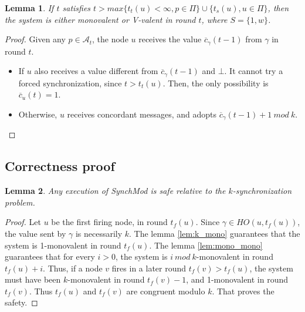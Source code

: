 \documentclass{article}
\newtheorem{lemma}{Lemma}[section]
\newcommand{\cent}{\gamma}
\newcommand{\ts}{t_{s}}
\newcommand{\tf}{t_{f}}
\newcommand{\try}{t_{t}}
\begin{document}
\begin{lemma}\label{lem:mono_bi}
	If $t$ satisfies $t > max \{\try(u) < \infty, p \in \Pi\} \cup \{\ts(u), u \in \Pi\}$,
	then the system is either monovalent or V-valent in round $t$, where $S = \{1, w\}$.
\end{lemma}
\begin{proof}
	Given any $p \in \mathcal{A}_t$, the node $u$ receives the value $\overline{c}_\cent(t-1)$ from $\cent$ in round $t$.
	\begin{itemize}
		\item If $u$ also receives a value different from $\overline{c}_\cent(t-1)$ and $\bot$.
			It cannot try a forced synchronization, since $t > \try(u)$.
			Then, the only possibility is $\overline{c}_u(t) = 1$.
		\item Otherwise, $u$ receives concordant messages, and adopts $\overline{c}_\cent(t-1)+1~mod~k$.
	\end{itemize}
\end{proof}

\subsection{Correctness proof}
\begin{lemma}\label{lem:safety}
	Any execution of SynchMod is safe relative to the $k$-synchronization problem.
\end{lemma}
\begin{proof}
	Let $u$ be the first firing node, in round $\tf(u)$.
	Since $\cent \in HO(u,\tf(u))$, the value sent by $\cent$ is necessarily $k$.
	The lemma \ref{lem:k_mono} guarantees that the system is 1-monovalent in round $\tf(u)$.
	The lemma \ref{lem:mono_mono} guarantees that for every $i > 0$, the system is $i~mod~k$-monovalent in round $\tf(u)+i$.
	Thus, if a node $v$ fires in a later round $\tf(v) > \tf(u)$, the system must have been $k$-monovalent in round $\tf(v)-1$,
	and 1-monovalent in round $\tf(v)$. Thus $\tf(u)$ and $\tf(v)$ are congruent modulo $k$.
	That proves the safety.
\end{proof}
\end{document}
